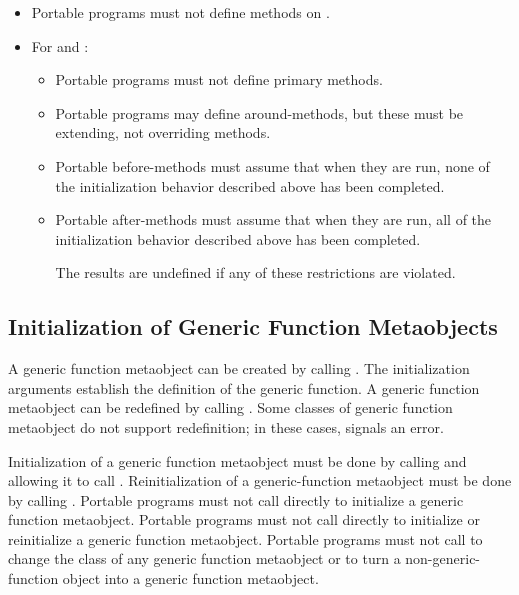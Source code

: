 \begin{itemize}
\item 
  Portable programs must not define methods on .
\item 
  For  and :
  \begin{itemize}
  \item 
    Portable programs must not define primary methods.
  \item 
    Portable programs may define around-methods, but these must be
    extending, not overriding methods. 
  \item 
    Portable before-methods must assume that when they are run, none of the
    initialization behavior described above has been completed. 
  \item 
    Portable after-methods must assume that when they are run, all of the
    initialization behavior described above has been completed. 

    The results are undefined if any of these restrictions are violated.
  \end{itemize}
\end{itemize}

\subsection{Initialization of Generic Function Metaobjects}
\label{INITIALIZATION-OF-GENERIC-FUNCTION-METAOBJECTS}

A generic function metaobject can be created by calling . The
initialization arguments establish the definition of the generic function. A
generic function metaobject can be redefined by calling
. Some classes of generic function metaobject do not
support redefinition; in these cases,  signals an
error.

Initialization of a generic function metaobject must be done by calling
 and allowing it to call
. Reinitialization of a generic-function metaobject
must be done by calling . Portable programs must not
call  directly to initialize a generic function
metaobject. Portable programs must not call  directly to
initialize or reinitialize a generic function metaobject. Portable programs must
not call  to change the class of any generic function
metaobject or to turn a non-generic-function object into a generic function
metaobject.

